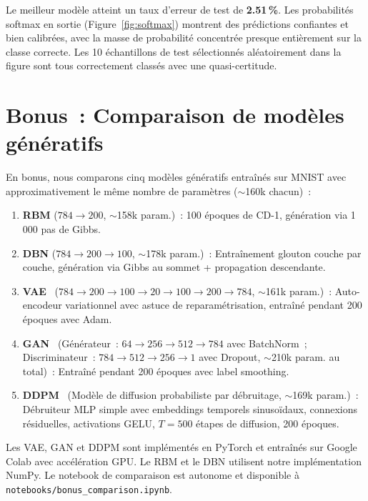 \documentclass[11pt,a4paper]{article}
\renewcommand{\texttt}[1]{\urlstyle{tt}\nolinkurl{#1}}
\begin{document}
Le meilleur mod\`ele atteint un taux d'erreur de test de \textbf{2.51\,\%}. Les probabilit\'es softmax en sortie (Figure~\ref{fig:softmax}) montrent des pr\'edictions confiantes et bien calibr\'ees, avec la masse de probabilit\'e concentr\'ee presque enti\`erement sur la classe correcte. Les 10 \'echantillons de test s\'electionn\'es al\'eatoirement dans la figure sont tous correctement class\'es avec une quasi-certitude.

\section{Bonus~: Comparaison de mod\`eles g\'en\'eratifs}
\label{sec:bonus}

En bonus, nous comparons cinq mod\`eles g\'en\'eratifs entra\^in\'es sur MNIST avec approximativement le m\^eme nombre de param\`etres ($\sim$160k chacun)~:

\begin{enumerate}
    \item \textbf{RBM} ($784 \to 200$, $\sim$158k param.)~: 100 \'epoques de CD-1, g\'en\'eration via 1\,000 pas de Gibbs.
    \item \textbf{DBN} ($784 \to 200 \to 100$, $\sim$178k param.)~: Entra\^inement glouton couche par couche, g\'en\'eration via Gibbs au sommet + propagation descendante.
    \item \textbf{VAE}~\cite{kingma2014} ($784 \to 200 \to 100 \to 20 \to 100 \to 200 \to 784$, $\sim$161k param.)~: Auto-encodeur variationnel avec astuce de reparam\'etrisation, entra\^in\'e pendant 200 \'epoques avec Adam.
    \item \textbf{GAN}~\cite{goodfellow2014} (G\'en\'erateur~: $64 \to 256 \to 512 \to 784$ avec BatchNorm~; Discriminateur~: $784 \to 512 \to 256 \to 1$ avec Dropout, $\sim$210k param. au total)~: Entra\^in\'e pendant 200 \'epoques avec label smoothing.
    \item \textbf{DDPM}~\cite{ho2020} (Mod\`ele de diffusion probabiliste par d\'ebruitage, $\sim$169k param.)~: D\'ebruiteur MLP simple avec embeddings temporels sinuso\"idaux, connexions r\'esiduelles, activations GELU, $T = 500$ \'etapes de diffusion, 200 \'epoques.
\end{enumerate}

Les VAE, GAN et DDPM sont impl\'ement\'es en PyTorch et entra\^in\'es sur Google Colab avec acc\'el\'eration GPU. Le RBM et le DBN utilisent notre impl\'ementation NumPy. Le notebook de comparaison est autonome et disponible \`a \texttt{notebooks/bonus\_comparison.ipynb}.
\end{document}
